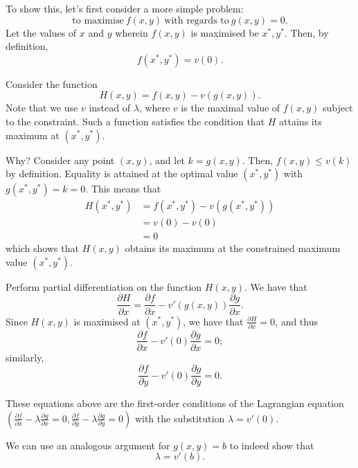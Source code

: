 \documentclass[a4paper, 12pt,oneside,openany]{book}
\begin{document}
To show this, let's first consider a more simple problem: $$\text{to maximise}\ f(x, y)\ \text{with regards to}\ g(x, y)=0.$$ Let the values of $x$ and $y$ wherein $f(x, y)$ is maximised be $x^*, y^*$. Then, by definition, $$f(x^*, y^*) = v(0).$$

Consider the function $$H(x, y)=f(x, y) - v(g(x, y)).$$ Note that we use $v$ instead of $\lambda$, where $v$ is the maximal value of $f(x, y)$ subject to the constraint. Such a function satisfies the condition that $H$ attains its maximum at $(x^*, y^*)$. 

Why? Consider any point $(x, y)$, and let $k = g(x, y)$. Then, $f(x, y) \leq v(k)$ by definition. Equality is attained at the optimal value $(x^*, y^*)$ with $g(x^*, y^*)=k=0$. This means that \begin{align*} H(x^*, y^*) &= f(x^*, y^*) - v(g(x^*, y^*))\\ &= v(0)-v(0) \\ &= 0 \end{align*} which shows that $H(x, y)$ obtains its maximum at the constrained maximum value $(x^*, y^*)$. 

Perform partial differentiation on the function $H(x, y)$. We have that $$\frac{\partial H}{\partial x} = \frac{\partial f}{\partial x} - v'(g(x, y)) \frac{\partial g}{\partial x}.$$ Since $H(x, y)$ is maximised at $(x^*, y^*)$, we have that $\frac{\partial H}{\partial x}=0$, and thus $$\frac{\partial f}{\partial x} - v'(0) \frac{\partial g}{\partial x}=0;$$ similarly, $$\frac{\partial f}{\partial y} - v'(0) \frac{\partial g}{\partial y}=0.$$

These equations above are the first-order conditions of the Lagrangian equation $(\frac{\partial f}{\partial x} - \lambda \frac{\partial g}{\partial x}=0, \frac{\partial f}{\partial y} - \lambda \frac{\partial g}{\partial y}=0)$ with the substitution $\lambda = v'(0)$. 

We can use an analogous argument for $g(x, y)=b$ to indeed show that $$\lambda= v'(b).$$
\end{document}
